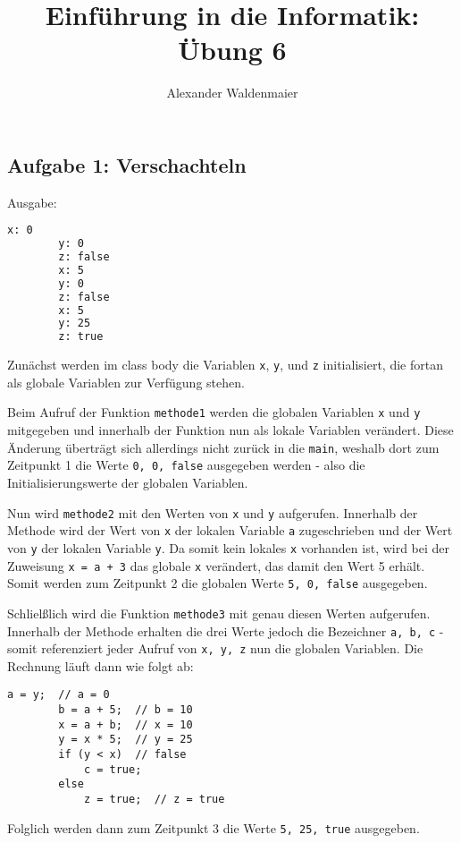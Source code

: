 \documentclass{article}
\title{Einführung in die Informatik: Übung 6}
\author{Alexander Waldenmaier}
\begin{document}
    \maketitle

    \subsection*{Aufgabe 1: Verschachteln}
    Ausgabe: 
    \begin{lstlisting}[numbers=none, language=bash]
        x: 0
        y: 0
        z: false
        x: 5
        y: 0
        z: false
        x: 5
        y: 25
        z: true
    \end{lstlisting}

    Zunächst werden im class body die Variablen \lstinline{x}, \lstinline{y}, und \lstinline{z} initialisiert, die fortan als globale Variablen zur Verfügung stehen. 
    
    Beim Aufruf der Funktion \lstinline{methode1} werden die globalen Variablen \lstinline{x} und \lstinline{y} mitgegeben und innerhalb der Funktion nun als lokale Variablen verändert. Diese Änderung überträgt sich allerdings nicht zurück in die \lstinline{main}, weshalb dort zum Zeitpunkt 1 die Werte \lstinline{0, 0, false} ausgegeben werden - also die Initialisierungswerte der globalen Variablen.
    
    Nun wird \lstinline{methode2} mit den Werten von \lstinline{x} und \lstinline{y} aufgerufen. Innerhalb der Methode wird der Wert von \lstinline{x} der lokalen Variable \lstinline{a} zugeschrieben und der Wert von \lstinline{y} der lokalen Variable \lstinline{y}. Da somit kein lokales \lstinline{x} vorhanden ist, wird bei der Zuweisung \lstinline{x = a + 3} das globale \lstinline{x} verändert, das damit den Wert 5 erhält. Somit werden zum Zeitpunkt 2 die globalen Werte \lstinline{5, 0, false} ausgegeben. 

    Schlielßlich wird die Funktion \lstinline{methode3} mit genau diesen Werten aufgerufen. Innerhalb der Methode erhalten die drei Werte jedoch die Bezeichner \lstinline{a, b, c} - somit referenziert jeder Aufruf von \lstinline{x, y, z} nun die globalen Variablen. Die Rechnung läuft dann wie folgt ab:
    \begin{lstlisting}[numbers=none]
        a = y;  // a = 0
        b = a + 5;  // b = 10
        x = a + b;  // x = 10
        y = x * 5;  // y = 25
        if (y < x)  // false
            c = true;
        else
            z = true;  // z = true
    \end{lstlisting}
    Folglich werden dann zum Zeitpunkt 3 die Werte \lstinline{5, 25, true} ausgegeben. 
\end{document}
